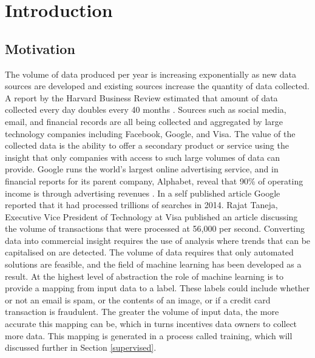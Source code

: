 \documentclass[12pt]{article}
\begin{document}
\clearpage\thispagestyle{empty}\addtocounter{page}{-1} 
\newpage \phantom{a}
\clearpage\thispagestyle{empty}\addtocounter{page}{-1} 
\newpage \phantom{a}

\tableofcontents

\newpage

\section{Introduction}

\subsection{Motivation}

The volume of data produced per year is increasing exponentially as new data sources are developed and existing sources increase the quantity of data collected. A report by the Harvard Business Review estimated that amount of data collected every day doubles every 40 months \cite{hbrBigData}. Sources such as social media, email, and financial records are all being collected and aggregated by large technology companies including Facebook, Google, and Visa. The value of the collected data is the ability to offer a secondary product or service using the insight that only companies with access to such large volumes of data can provide.
\newline
\newline
Google runs the world's largest online advertising service, and in financial reports for its parent company, Alphabet, reveal that 90\% of operating income is through advertising revenues \cite{alphabetFinancials}. In a self published article \cite{googleTrends2014} Google reported that it had processed trillions of searches in 2014. Rajat Taneja, Executive Vice President of Technology at Visa published an article \cite{visaMachineLearning} discussing the volume of transactions that were processed at 56,000 per second.
\newline
\newline
Converting data into commercial insight requires the use of analysis where trends that can be capitalised on are detected. The volume of data requires that only automated solutions are feasible, and the field of machine learning has been developed as a result. At the highest level of abstraction the role of machine learning is to provide a mapping from input data to a label. These labels could include whether or not an email is spam, or the contents of an image, or if a credit card transaction is fraudulent. The greater the volume of input data, the more accurate this mapping can be, which in turns incentives data owners to collect more data. This mapping is generated in a process called training, which will discussed further in Section \ref{supervised}.
\end{document}
